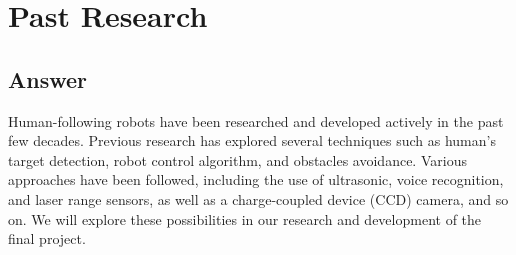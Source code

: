 \documentclass[
	12pt, %
]{fphw}
\begin{document}
\section*{Past Research}

\subsection*{Answer}

 Human-following robots have been researched and developed actively in the past few decades. Previous research has explored several techniques such as human’s target detection, robot control algorithm, and obstacles avoidance. Various approaches have been followed, including the use of ultrasonic, voice recognition, and laser range sensors, as well as a charge-coupled device (CCD) camera, and so on. We will explore these possibilities in our research and development of the final project.
\end{document}
